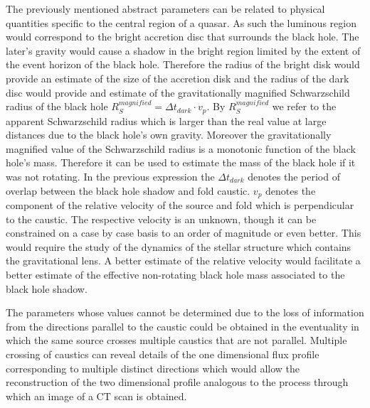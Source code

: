 The previously mentioned abstract parameters can be related to
physical quantities specific to the central region of a quasar.  As
such the luminous region would correspond to the bright accretion disc
that surrounds the black hole. The later's gravity would cause a
shadow in the bright region limited by the extent of the event horizon
of the black hole. Therefore the radius of the bright disk would
provide an estimate of the size of the accretion disk and the radius
of the dark disc would provide and estimate of the gravitationally
magnified Schwarzschild radius of the black hole $R_{S}^{magnified} =
\Delta t_{dark} \cdot v_p$.  By $R_{S}^{magnified}$ we refer to the
apparent Schwarzschild radius which is larger than the real value at
large distances due to the black hole's own gravity.  Moreover the
gravitationally magnified value of the Schwarzschild radius is a
monotonic function of the black hole's mass. Therefore it can be used
to estimate the mass of the black hole if it was not rotating. In the
previous expression the $\Delta t_{dark}$ denotes the period of
overlap between the black hole shadow and fold caustic.  $v_p$ denotes
the component of the relative velocity of the source and fold which is
perpendicular to the caustic.  The respective velocity is an unknown,
though it can be constrained on a case by case basis to an order of
magnitude or even better. This would require the study of the dynamics
of the stellar structure which contains the gravitational lens.  A
better estimate of the relative velocity would facilitate a better
estimate of the effective non-rotating black hole mass associated to
the black hole shadow.

    
The parameters whose values cannot be determined due to the loss of information from the directions parallel to the 
caustic could be obtained in the eventuality in which the same source crosses multiple caustics that are not parallel. 
Multiple crossing of caustics can reveal details of the one dimensional flux profile corresponding to multiple distinct 
directions which would allow the reconstruction of the two dimensional profile analogous to the process through which an image of a CT scan is obtained.  

 

